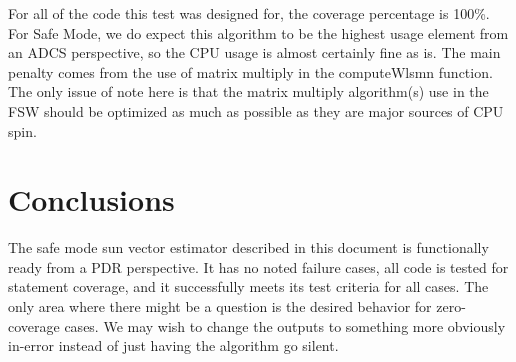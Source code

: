 \documentclass[]{BasiliskReportMemo}
\begin{document}
For all of the code this test was designed for, the coverage percentage is 
100\%.  For Safe Mode, we do expect this algorithm to be the highest usage 
element from an ADCS perspective, so the CPU usage is almost certainly fine as 
is.  The main penalty comes from the use of matrix multiply in the computeWlsmn 
function.  The only issue of note here is that the matrix multiply algorithm(s) 
use in the FSW should be optimized as much as possible as they are major sources 
of CPU spin.

\section{Conclusions}
The safe mode sun vector estimator described in this document is functionally 
ready from a PDR perspective.  It has no noted failure cases, all code is tested 
for statement coverage, and it successfully meets its test criteria for all 
cases.  The only area where there might be a question is the desired behavior 
for zero-coverage cases.  We may wish to change the outputs to something more 
obviously in-error instead of just having the algorithm go silent.










%	
%
%
%








\end{document}
